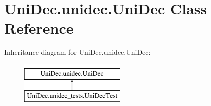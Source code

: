 \hypertarget{class_uni_dec_1_1unidec_1_1_uni_dec}{}\section{Uni\+Dec.\+unidec.\+Uni\+Dec Class Reference}
\label{class_uni_dec_1_1unidec_1_1_uni_dec}
Inheritance diagram for Uni\+Dec.\+unidec.\+Uni\+Dec\+:\begin{figure}[H]
\begin{center}
\leavevmode
\includegraphics[height=2.000000cm]{class_uni_dec_1_1unidec_1_1_uni_dec}
\end{center}
\end{figure}
